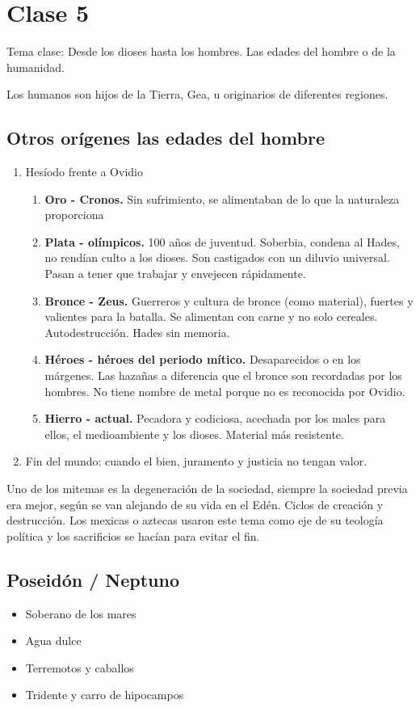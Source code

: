 \chapter{Clase 5}\label{ch:clase5}
Tema clase: Desde los dioses hasta los hombres. Las edades del hombre o de la humanidad.

Los humanos son hijos de la Tierra, Gea, u originarios de diferentes regiones.

\section{Otros orígenes las edades del hombre}
\begin{enumerate}
	\item Hesíodo frente a Ovidio
	      \begin{enumerate}
		      \item \textbf{Oro - Cronos.} Sin sufrimiento, se alimentaban de lo que la naturaleza proporciona
		      \item \textbf{Plata - olímpicos.} 100 años de juventud. Soberbia, condena al Hades, no rendían culto a los dioses. Son castigados con un diluvio universal. Pasan a tener que trabajar y envejecen rápidamente.
		      \item \textbf{Bronce - Zeus.} Guerreros y cultura de bronce (como material), fuertes y valientes para la batalla. Se alimentan con carne y no solo cereales. Autodestrucción. Hades sin memoria.
		      \item \textbf{Héroes - héroes del periodo mítico.} Desaparecidos o en los márgenes. Las hazañas a diferencia que el bronce son recordadas por los hombres. No tiene nombre de metal porque no es reconocida por Ovidio.
		      \item \textbf{Hierro - actual.} Pecadora y codiciosa, acechada por los males para ellos, el medioambiente y los dioses. Material más resistente.
	      \end{enumerate}
	\item Fin del mundo: cuando el bien, juramento y justicia no tengan valor.
\end{enumerate}

Uno de los mitemas es la degeneración de la sociedad, siempre la sociedad previa era mejor, según se van alejando de su vida en el Edén. Ciclos de creación y destrucción. Los mexicas o aztecas usaron este tema como eje de su teología política y los sacrificios se hacían para evitar el fin.

\section{Poseidón / Neptuno}
\begin{itemize}
	\item Soberano de los mares
	\item Agua dulce
	\item Terremotos y caballos
	\item Tridente y carro de hipocampos
\end{itemize}


